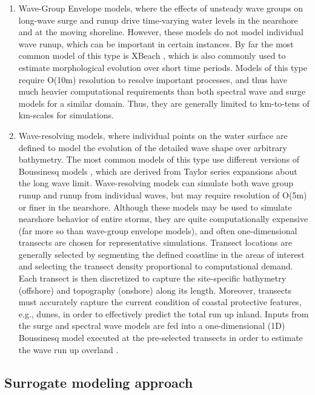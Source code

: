 \begin{enumerate}
    \item Wave-Group Envelope models, where the effects of unsteady wave groups on long-wave surge and runup drive time-varying water levels in the nearshore and at the moving shoreline. However, these models do not model individual wave runup, which can be important in certain instances. By far the most common model of this type is XBeach \citep{roelvink2009modelling}, which is also commonly used to estimate morphological evolution over short time periods. Models of this type require O(10m) resolution to resolve important processes, and thus have much heavier computational requirements than both spectral wave and surge models for a similar domain. Thus, they are generally limited to km-to-tens of km-scales for simulations. 
    \item Wave-resolving models, where individual points on the water surface are defined to model the evolution of the detailed wave shape over arbitrary bathymetry. The most common models of this type use different versions of Boussinesq models \citep{lynett2002modeling,kennedy2000boussinesq,nwogu2010infragravity}, which are derived from Taylor series expansions about the long wave limit. Wave-resolving models can simulate both wave group runup and runup from individual waves, but may require resolution of O(5m) or finer in the nearshore. Although these models may be used to simulate nearshore behavior of entire storms, they are quite computationally expensive (far more so than wave-group envelope models), and often one-dimensional transects are chosen for representative simulations. Transect locations are generally selected by segmenting the defined coastline in the areas of interest and selecting the transect density proportional to computational demand. Each transect is then discretized to capture the site-specific bathymetry (offshore) and topography (onshore) along its length. Moreover, transects must accurately capture the current condition of coastal protective features, e.g., dunes, in order to effectively predict the total run up inland. Inputs from the surge and spectral wave models are fed into a one-dimensional (1D) Boussinesq model executed at the pre-selected transects in order to estimate the wave run up overland \citep{demirbilek2009wave}. 
\end{enumerate}

\subsection{Surrogate modeling approach}

